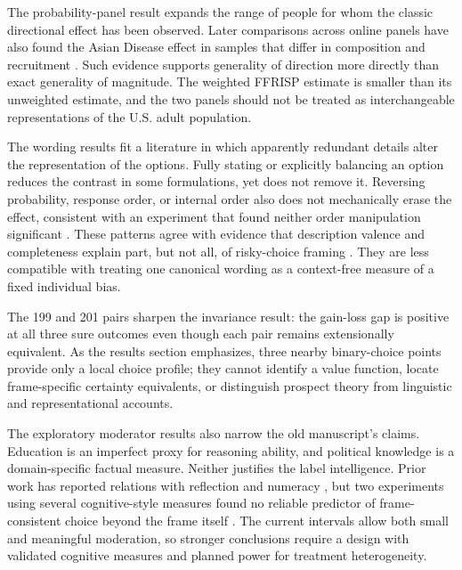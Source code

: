 \documentclass[11pt]{article}
\begin{document}
The probability-panel result expands the range of people for whom the classic directional effect has been observed. Later comparisons across online panels have also found the Asian Disease effect in samples that differ in composition and recruitment \parencite{chandler2019panels,stagnaro2026samples}. Such evidence supports generality of direction more directly than exact generality of magnitude. The weighted FFRISP estimate is smaller than its unweighted estimate, and the two panels should not be treated as interchangeable representations of the U.S. adult population.

The wording results fit a literature in which apparently redundant details alter the representation of the options. Fully stating or explicitly balancing an option reduces the contrast in some formulations, yet does not remove it. Reversing probability, response order, or internal order also does not mechanically erase the effect, consistent with an experiment that found neither order manipulation significant \parencite{peng2017mixed}. These patterns agree with evidence that description valence and completeness explain part, but not all, of risky-choice framing \parencite{dekay2024mismatched,dekay2026complete}. They are less compatible with treating one canonical wording as a context-free measure of a fixed individual bias.

The 199 and 201 pairs sharpen the invariance result: the gain-loss gap is positive at all three sure outcomes even though each pair remains extensionally equivalent. As the results section emphasizes, three nearby binary-choice points provide only a local choice profile; they cannot identify a value function, locate frame-specific certainty equivalents, or distinguish prospect theory from linguistic and representational accounts.

The exploratory moderator results also narrow the old manuscript's claims. Education is an imperfect proxy for reasoning ability, and political knowledge is a domain-specific factual measure. Neither justifies the label intelligence. Prior work has reported relations with reflection and numeracy \parencite{stanovich1998individual,leboeuf2003deep,peters2008numeracy}, but two experiments using several cognitive-style measures found no reliable predictor of frame-consistent choice beyond the frame itself \parencite{mandel2018cognitive}. The current intervals allow both small and meaningful moderation, so stronger conclusions require a design with validated cognitive measures and planned power for treatment heterogeneity.
\end{document}
